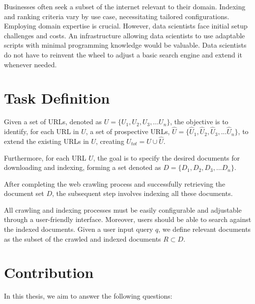 Businesses often seek a subset of the internet relevant to their domain. Indexing and ranking criteria vary by use case, necessitating tailored configurations. Employing domain expertise is crucial. However, data scientists face initial setup challenges and costs. An infrastructure allowing data scientists to use adaptable scripts with minimal programming knowledge would be valuable. Data scientists do not have to reinvent the wheel to adjust a basic search engine and extend it whenever needed.  

\section{Task Definition}
Given a set of URLs, denoted as $U = \{U_1, U_2, U_3, ... U_n\}$, the objective is to identify, for each URL in $U$, a set of prospective URLs, $\hat U = \{\hat U_1, \hat U_2, \hat U_3, ... \hat 
  U_n\}$, to extend the existing URLs in $U$, creating $U_{tot} = U \cup \hat U$.
  
  Furthermore, for each URL $U$, the goal is to specify the desired documents for downloading and indexing, forming a set denoted as $D = \{D_1, D_2, D_3, ...D_n\}$.

After completing the web crawling process and successfully retrieving the document set $D$, the subsequent step involves indexing all these documents. 

All crawling and indexing processes must be easily configurable and adjustable through a user-friendly interface. Moreover, users should be able to search against the indexed documents. Given a user input query $q$, we define relevant documents as the subset of the crawled and indexed documents $R \subset D$.

\section{Contribution}\label{sec:contribution}

In this thesis, we aim to answer the following questions:

